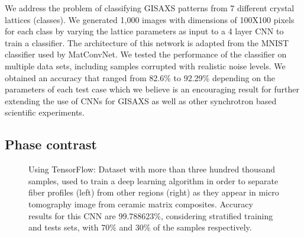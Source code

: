 \documentclass[conference]{IEEEtran}
\begin{document}
We address the problem of classifying GISAXS patterns from 7 different crystal lattices (classes). We
generated 1,000 images with dimensions of 100X100 pixels for each class by varying the lattice
parameters as input to a 4 layer CNN to train a classifier. The architecture of this network is
adapted from the MNIST classifier used by MatConvNet. We tested the performance of the classifier on
multiple data sets, including samples corrupted with realistic noise levels. We obtained an accuracy
that ranged from 82.6\% to 92.29\% depending on the parameters of each test case which we believe is
an encouraging result for further extending the use of CNNs for GISAXS as well as other synchrotron
based scientific experiments.

\subsection{Phase contrast}


\begin{figure}[t!]
\centering
{}
\hfil
{}
\caption{Using TensorFlow: Dataset with more than three hundred thousand samples, used to train a deep
learning algorithm in order to separate fiber profiles (left) from other regions (right) as they
appear in micro tomography image from ceramic matrix composites. Accuracy results for this CNN are
99.788623\%, considering stratified training and tests sets, with 70\% and 30\% of the samples
respectively.}
\label{fig_sim}
\end{figure}
%
\end{document}
